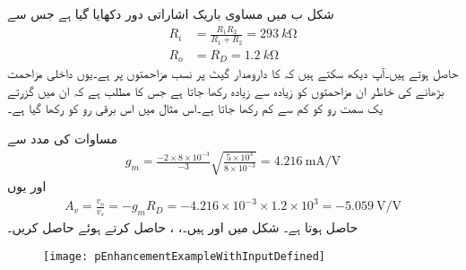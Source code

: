 شکل  ب میں مساوی باریک اشاراتی دور دکھایا گیا ہے جس سے
\begin{align*}
R_i&=\frac{R_1 R_2}{R_1+R_2}=\SI{293}{k \ohm}\\
R_o&=R_D=\SI{1.2}{k \ohm}
\end{align*}
حاصل ہوتے ہیں۔آپ دیکھ سکتے ہیں کہ  کا دارومدار گیٹ پر نسب مزاحمتوں پر ہے۔یوں داخلی مزاحمت بڑھانے کی خاطر ان مزاحمتوں کو زیادہ سے زیادہ رکھا جاتا ہے جس کا مطلب ہے کہ ان میں گزرتے یک سمت رو کو کم سے کم رکھا جاتا ہے۔اس مثال میں اس برقی رو کو   رکھا گیا ہے۔

مساوات  کی مدد سے
\begin{align*}
g_m=\frac{-2 \times 8 \times 10^{-3}}{-3} \sqrt{\frac{5 \times 10^{3}}{8 \times 10^{-3}}}=\SI[per=frac,fraction=nice]{4.216}{\milli \ampere \per \volt}
\end{align*}
اور یوں
\begin{align*}
A_v=\frac{v_o}{v_s}=-g_m R_D=-4.216 \times 10^{-3} \times 1.2 \times 10^3=\SI[per=frac,fraction=nice]{-5.059}{\volt \per \volt}
\end{align*}
حاصل ہوتا ہے۔
شکل  میں  اور  ہیں۔، ،  حاصل کرتے ہوئے  حاصل کریں۔ 

\begin{figure}
\centering
\texttt{[image: pEnhancementExampleWithInputDefined]}
\caption{}
\label{شکل_ماسفیٹ_جمع_ماسفیٹ_مثال_درکار_مداخل}
\end{figure}

